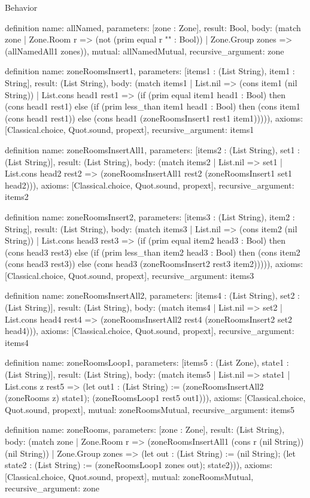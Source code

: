 \begin{lexlean}{Behavior}
\begin{semanticmodule}
definition{
  name: allNamed,
  parameters: [zone : Zone],
  result: Bool,
  body: (match zone
    | Zone.Room r => (not (prim equal r "" : Bool))
    | Zone.Group zones => (allNamedAll1 zones)),
  mutual: allNamedMutual,
  recursive_argument: zone
}

definition{
  name: zoneRoomsInsert1,
  parameters: [items1 : (List String), item1 : String],
  result: (List String),
  body: (match items1
    | List.nil => (cons item1 (nil String))
    | List.cons head1 rest1 => (if (prim equal item1 head1 : Bool) then (cons head1 rest1) else (if (prim less_than item1 head1 : Bool) then (cons item1 (cons head1 rest1)) else (cons head1 (zoneRoomsInsert1 rest1 item1))))),
  axioms: [Classical.choice, Quot.sound, propext],
  recursive_argument: items1
}

definition{
  name: zoneRoomsInsertAll1,
  parameters: [items2 : (List String), set1 : (List String)],
  result: (List String),
  body: (match items2
    | List.nil => set1
    | List.cons head2 rest2 => (zoneRoomsInsertAll1 rest2 (zoneRoomsInsert1 set1 head2))),
  axioms: [Classical.choice, Quot.sound, propext],
  recursive_argument: items2
}

definition{
  name: zoneRoomsInsert2,
  parameters: [items3 : (List String), item2 : String],
  result: (List String),
  body: (match items3
    | List.nil => (cons item2 (nil String))
    | List.cons head3 rest3 => (if (prim equal item2 head3 : Bool) then (cons head3 rest3) else (if (prim less_than item2 head3 : Bool) then (cons item2 (cons head3 rest3)) else (cons head3 (zoneRoomsInsert2 rest3 item2))))),
  axioms: [Classical.choice, Quot.sound, propext],
  recursive_argument: items3
}

definition{
  name: zoneRoomsInsertAll2,
  parameters: [items4 : (List String), set2 : (List String)],
  result: (List String),
  body: (match items4
    | List.nil => set2
    | List.cons head4 rest4 => (zoneRoomsInsertAll2 rest4 (zoneRoomsInsert2 set2 head4))),
  axioms: [Classical.choice, Quot.sound, propext],
  recursive_argument: items4
}

definition{
  name: zoneRoomsLoop1,
  parameters: [items5 : (List Zone), state1 : (List String)],
  result: (List String),
  body: (match items5
    | List.nil => state1
    | List.cons z rest5 => (let out1 : (List String) := (zoneRoomsInsertAll2 (zoneRooms z) state1); (zoneRoomsLoop1 rest5 out1))),
  axioms: [Classical.choice, Quot.sound, propext],
  mutual: zoneRoomsMutual,
  recursive_argument: items5
}

definition{
  name: zoneRooms,
  parameters: [zone : Zone],
  result: (List String),
  body: (match zone
    | Zone.Room r => (zoneRoomsInsertAll1 (cons r (nil String)) (nil String))
    | Zone.Group zones => (let out : (List String) := (nil String); (let state2 : (List String) := (zoneRoomsLoop1 zones out); state2))),
  axioms: [Classical.choice, Quot.sound, propext],
  mutual: zoneRoomsMutual,
  recursive_argument: zone
}


\end{semanticmodule}
\end{lexlean}
